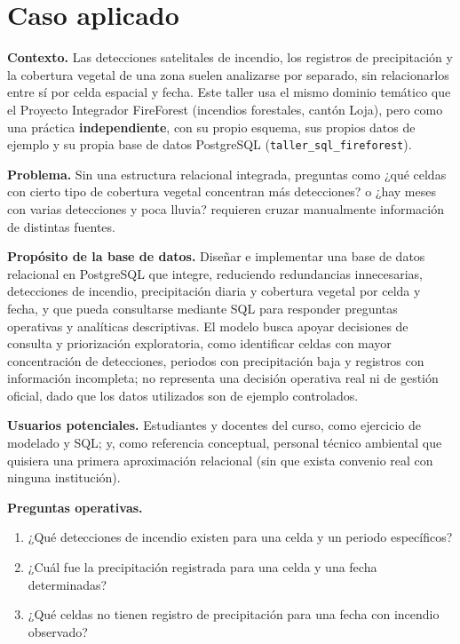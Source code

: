 \documentclass[11pt,a4paper]{article}
\begin{document}
\section{Caso aplicado}

\textbf{Contexto.} Las detecciones satelitales de incendio, los registros de precipitaci\'on y la
cobertura vegetal de una zona suelen analizarse por separado, sin relacionarlos entre s\'i por
celda espacial y fecha. Este taller usa el mismo dominio tem\'atico que el Proyecto Integrador
FireForest (incendios forestales, cant\'on Loja), pero como una pr\'actica \textbf{independiente},
con su propio esquema, sus propios datos de ejemplo y su propia base de datos PostgreSQL
(\texttt{taller\_sql\_fireforest}).

\textbf{Problema.} Sin una estructura relacional integrada, preguntas como
\guillemotleft{}¿qu\'e celdas con cierto tipo de cobertura vegetal concentran m\'as
detecciones?\guillemotright{} o \guillemotleft{}¿hay meses con varias detecciones y poca
lluvia?\guillemotright{} requieren cruzar manualmente informaci\'on de distintas fuentes.

\textbf{Prop\'osito de la base de datos.} Dise\~nar e implementar una base de datos relacional en
PostgreSQL que integre, reduciendo redundancias innecesarias, detecciones de incendio,
precipitaci\'on diaria y cobertura vegetal por celda y fecha, y que pueda consultarse mediante SQL
para responder preguntas operativas y anal\'iticas descriptivas. El modelo busca apoyar
decisiones de consulta y priorizaci\'on exploratoria, como identificar celdas con mayor
concentraci\'on de detecciones, periodos con precipitaci\'on baja y registros con informaci\'on
incompleta; no representa una decisi\'on operativa real ni de gesti\'on oficial, dado que los
datos utilizados son de ejemplo controlados.

\textbf{Usuarios potenciales.} Estudiantes y docentes del curso, como ejercicio de modelado y
SQL; y, como referencia conceptual, personal t\'ecnico ambiental que quisiera una primera
aproximaci\'on relacional (sin que exista convenio real con ninguna instituci\'on).

\textbf{Preguntas operativas.}
\begin{enumerate}[itemsep=0pt]
    \item ¿Qu\'e detecciones de incendio existen para una celda y un periodo espec\'ificos?
    \item ¿Cu\'al fue la precipitaci\'on registrada para una celda y una fecha determinadas?
    \item ¿Qu\'e celdas no tienen registro de precipitaci\'on para una fecha con incendio
          observado?
\end{enumerate}
\end{document}
